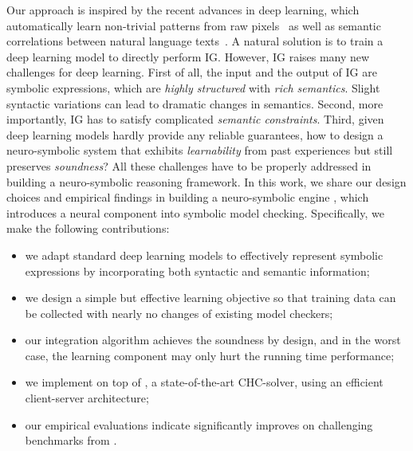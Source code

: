 Our approach is inspired by the recent advances in deep learning, which automatically learn non-trivial patterns from raw pixels~\cite{Krizhevsky:nips12} as well as semantic correlations between natural language texts~\cite{Mikolov:nips13}.
A natural solution is to train a deep learning model to directly perform IG. 
However, IG raises many new challenges for deep learning. 
First of all, the input and the output of IG are symbolic expressions, which are \textit{highly structured} with \textit{rich semantics}. 
Slight syntactic variations can lead to dramatic changes in semantics.
Second, more importantly, IG has to satisfy complicated \textit{semantic constraints}. 
Third, given deep learning models hardly provide any reliable guarantees, how to design a neuro-symbolic system that exhibits \textit{learnability} from past experiences but still preserves \textit{soundness}?
All these challenges have to be properly addressed in building a neuro-symbolic reasoning framework. 
In this work, we share our design choices and empirical findings in building a neuro-symbolic engine \dpy, which introduces a neural component into symbolic model checking. 
Specifically, we make the following contributions: 
\begin{itemize}
    \item we adapt standard deep learning models to effectively represent symbolic expressions by incorporating both syntactic and semantic information;
    \item we design a simple but effective learning objective so that training data can be collected with nearly no changes of existing model checkers; 
    \item our integration algorithm achieves the soundness by design, and in the worst case, the learning component may only hurt the running time performance; 
    \item we implement \dpy on top of \spc, a state-of-the-art CHC-solver, using an efficient client-server architecture;
    \item our empirical evaluations indicate \dpy significantly improves \spc on 
    challenging benchmarks from \chccomp.
\end{itemize}

